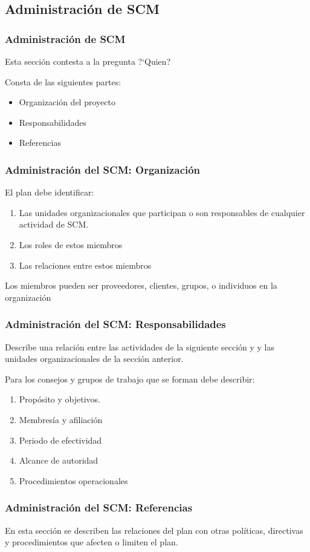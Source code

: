 \subsection{Administraci\'on de SCM}
\begin{frame}
	\frametitle{Administraci\'on de SCM
	}
	Esta secci\'on contesta a la pregunta ?`Quien? 

	Consta de las siguientes partes:
	\begin{itemize}
		\item Organizaci\'on del proyecto
		\item Responsabilidades
		\item Referencias
	\end{itemize}
\end{frame}
\begin{frame}
	\frametitle{Administraci\'on del SCM: Organizaci\'on}
	El plan debe identificar:
	\begin{enumerate}
		\item Las unidades organizacionales que participan o son
			responsables de cualquier actividad de SCM.
		\item Los roles de estos miembros
		\item Las relaciones entre estos miembros
	\end{enumerate}

	Los miembros pueden ser proveedores, clientes, grupos, o individuos en
	la organizaci\'on
\end{frame}
\begin{frame}
	\frametitle{Administraci\'on del SCM: Responsabilidades}
	Describe una relaci\'on entre las actividades de la siguiente secci\'on y 
	y las unidades organizacionales de la secci\'on anterior. 

	Para los consejos y grupos de trabajo que se forman debe describir: 
	\begin{enumerate}
		\item Prop\'osito y objetivos. 
		\item Membres\'ia y afiliaci\'on
		\item Periodo de efectividad
		\item Alcance de autoridad
		\item Procedimientos operacionales
	\end{enumerate}
\end{frame}
\begin{frame}
	\frametitle{Administraci\'on del SCM: Referencias}
En esta secci\'on se describen las relaciones del plan con otras pol\'iticas, directivas y
procedimientos que afecten o limiten el plan. 
\end{frame}
